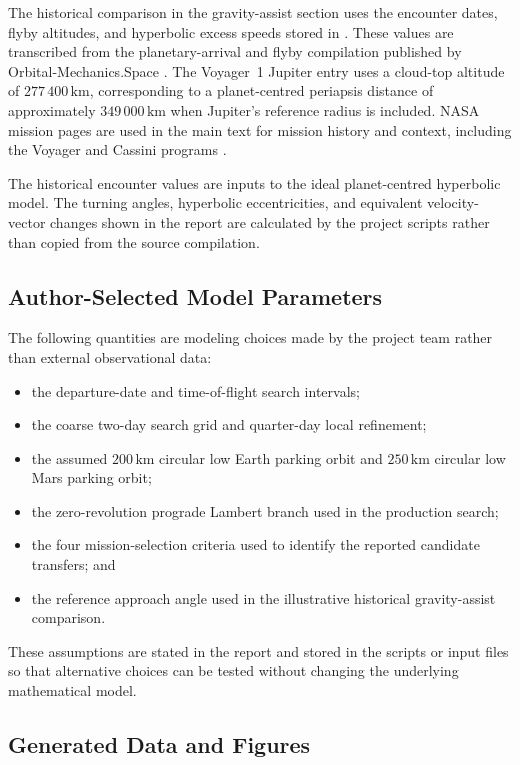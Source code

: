 \documentclass[11pt,a4paper]{article}
\begin{document}
The historical comparison in the gravity-assist section uses the encounter
dates, flyby altitudes, and hyperbolic excess speeds stored in
. These values are transcribed
from the planetary-arrival and flyby compilation published by
Orbital-Mechanics.Space \cite{orbitalflyby}. The Voyager~1 Jupiter entry uses a
cloud-top altitude of \(277\,400\,\mathrm{km}\), corresponding to a
planet-centred periapsis distance of approximately \(349\,000\,\mathrm{km}\)
when Jupiter's reference radius is included. NASA mission pages are used in the
main text for mission history and context, including the Voyager and Cassini
programs \cite{voyager1,cassiniassist}.

The historical encounter values are inputs to the ideal planet-centred
hyperbolic model. The turning angles, hyperbolic eccentricities, and equivalent
velocity-vector changes shown in the report are calculated by the project
scripts rather than copied from the source compilation.

\subsection{Author-Selected Model Parameters}

The following quantities are modeling choices made by the project team rather
than external observational data:
\begin{itemize}
  \item the departure-date and time-of-flight search intervals;
  \item the coarse two-day search grid and quarter-day local refinement;
  \item the assumed \(200\,\mathrm{km}\) circular low Earth parking orbit and
        \(250\,\mathrm{km}\) circular low Mars parking orbit;
  \item the zero-revolution prograde Lambert branch used in the production
        search;
  \item the four mission-selection criteria used to identify the reported
        candidate transfers; and
  \item the reference approach angle used in the illustrative historical
        gravity-assist comparison.
\end{itemize}
These assumptions are stated in the report and stored in the scripts or input
files so that alternative choices can be tested without changing the underlying
mathematical model.

\subsection{Generated Data and Figures}
\end{document}
